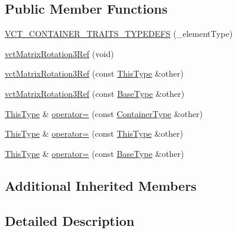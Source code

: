 \subsection*{Public Member Functions}
\begin{DoxyCompactItemize}
\item 
\hyperlink{classvct_matrix_rotation3_ref_a652fd3b2ea31f9fc7d6782e796a087d8}{V\-C\-T\-\_\-\-C\-O\-N\-T\-A\-I\-N\-E\-R\-\_\-\-T\-R\-A\-I\-T\-S\-\_\-\-T\-Y\-P\-E\-D\-E\-F\-S} (\-\_\-element\-Type)
\item 
\hyperlink{classvct_matrix_rotation3_ref_a1a6432e931dbde0cafd5be068e4e239d}{vct\-Matrix\-Rotation3\-Ref} (void)
\item 
\hyperlink{classvct_matrix_rotation3_ref_a2cfe979deadb9e4f6deee885c1a27265}{vct\-Matrix\-Rotation3\-Ref} (const \hyperlink{classvct_matrix_rotation3_ref_aa4f99a97ebf5b94d4030335f45c91966}{This\-Type} \&other)
\item 
\hyperlink{classvct_matrix_rotation3_ref_ac8e3b31ae23fb9279e78aa52b978e696}{vct\-Matrix\-Rotation3\-Ref} (const \hyperlink{classvct_matrix_rotation3_ref_a6710fec4e5d3c1a4f8f376293b1f30dd}{Base\-Type} \&other)
\item 
\hyperlink{classvct_matrix_rotation3_ref_aa4f99a97ebf5b94d4030335f45c91966}{This\-Type} \& \hyperlink{classvct_matrix_rotation3_ref_a005130428ee9ad279f96ecfd0c2036f3}{operator=} (const \hyperlink{classvct_matrix_rotation3_ref_acf072a6c67950bf0621787114bb016b4}{Container\-Type} \&other)
\item 
\hyperlink{classvct_matrix_rotation3_ref_aa4f99a97ebf5b94d4030335f45c91966}{This\-Type} \& \hyperlink{classvct_matrix_rotation3_ref_ad1b0080ea17d77a4376175ceb4afa5ba}{operator=} (const \hyperlink{classvct_matrix_rotation3_ref_aa4f99a97ebf5b94d4030335f45c91966}{This\-Type} \&other)
\item 
\hyperlink{classvct_matrix_rotation3_ref_aa4f99a97ebf5b94d4030335f45c91966}{This\-Type} \& \hyperlink{classvct_matrix_rotation3_ref_a50dc3884fb1294cc92212917c28b9c02}{operator=} (const \hyperlink{classvct_matrix_rotation3_ref_a6710fec4e5d3c1a4f8f376293b1f30dd}{Base\-Type} \&other)
\end{DoxyCompactItemize}
\subsection*{Additional Inherited Members}


\subsection{Detailed Description}
